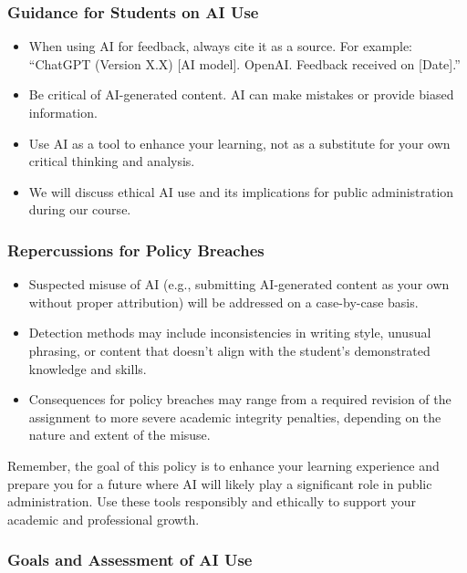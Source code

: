 \documentclass[12pt, letterpaper]{article}
\begin{document}
\subsubsection*{Guidance for Students on AI Use}

\begin{itemize}
    \item When using AI for feedback, always cite it as a source. For example: ``ChatGPT (Version X.X) [AI model]. OpenAI. Feedback received on [Date].''
    \item Be critical of AI-generated content. AI can make mistakes or provide biased information.
    \item Use AI as a tool to enhance your learning, not as a substitute for your own critical thinking and analysis.
    \item We will discuss ethical AI use and its implications for public administration during our course.
\end{itemize}

\subsubsection*{Repercussions for Policy Breaches}

\begin{itemize}
    \item Suspected misuse of AI (e.g., submitting AI-generated content as your own without proper attribution) will be addressed on a case-by-case basis.
    \item Detection methods may include inconsistencies in writing style, unusual phrasing, or content that doesn't align with the student's demonstrated knowledge and skills.
    \item Consequences for policy breaches may range from a required revision of the assignment to more severe academic integrity penalties, depending on the nature and extent of the misuse.
\end{itemize}

\noindent Remember, the goal of this policy is to enhance your learning experience and prepare you for a future where AI will likely play a significant role in public administration. Use these tools responsibly and ethically to support your academic and professional growth.

\subsubsection*{Goals and Assessment of AI Use}
\end{document}
